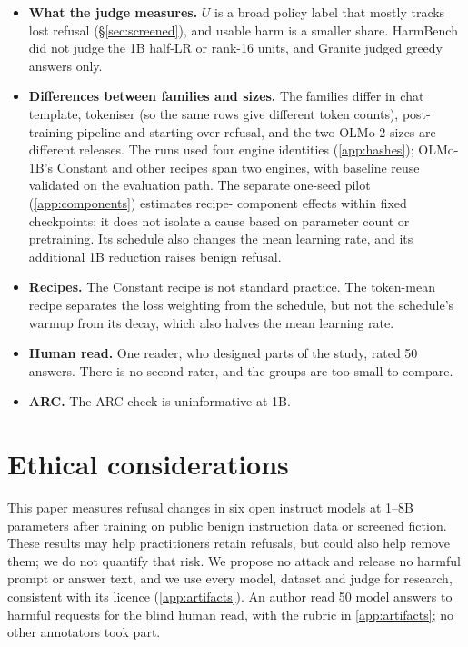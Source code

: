 \documentclass[11pt]{article}
\begin{document}
\begin{itemize}
        sample SD's 90\% range is 0.23--1.73 times the true SD. The OLMo band
        covers evaluation noise only. The 1B variant rows with rank 16 or half
        the learning rate rest on one or two seeds. The logit interactions
        have approximately 2.7--6.2 df. The refusal-direction probe has two or three recovered seeds per
        cell, with four missing units; harmful--harmless separation can reflect content or task
        differences and is not a causally validated refusal mechanism.
  \item \textbf{What the judge measures.} $U$ is a broad policy label that
        mostly tracks lost refusal (\S\ref{sec:screened}), and usable harm is a
        smaller share. HarmBench did not judge the 1B half-LR or rank-16 units,
        and Granite judged greedy answers only.
  \item \textbf{Differences between families and sizes.} The families differ
        in chat template, tokeniser (so the same rows give different token
        counts), post-training pipeline and starting over-refusal, and the two
        OLMo-2 sizes are different releases. The runs used four engine
        identities (\cref{app:hashes}); OLMo-1B's Constant and other recipes
        span two engines, with baseline reuse validated on the evaluation path.
        The separate one-seed pilot (\cref{app:components}) estimates recipe-
        component effects within fixed checkpoints; it does not isolate a cause
        based on parameter count or pretraining. Its schedule also changes the
        mean learning rate, and its additional 1B reduction raises benign refusal.
  \item \textbf{Recipes.} The Constant recipe is not standard practice. The
        token-mean recipe separates the loss weighting from the schedule, but
        not the schedule's warmup from its decay, which also halves the mean
        learning rate.
  \item \textbf{Human read.} One reader, who designed parts of the study,
        rated 50 answers. There is no second rater, and the groups are too
        small to compare.
  \item \textbf{ARC.} The ARC check is uninformative at 1B.
\end{itemize}

\section*{Ethical considerations}

This paper measures refusal changes in six open instruct models at 1--8B
parameters after training on public benign instruction data or screened
fiction. These results may help practitioners retain refusals, but could also
help remove them; we do not quantify that risk. We propose no attack and
release no harmful prompt or answer text, and
we use every model, dataset and judge for research, consistent with its licence
(\cref{app:artifacts}). An author read 50 model answers to harmful requests for
the blind human read, with the rubric in \cref{app:artifacts}; no other
annotators took part.
\end{document}
